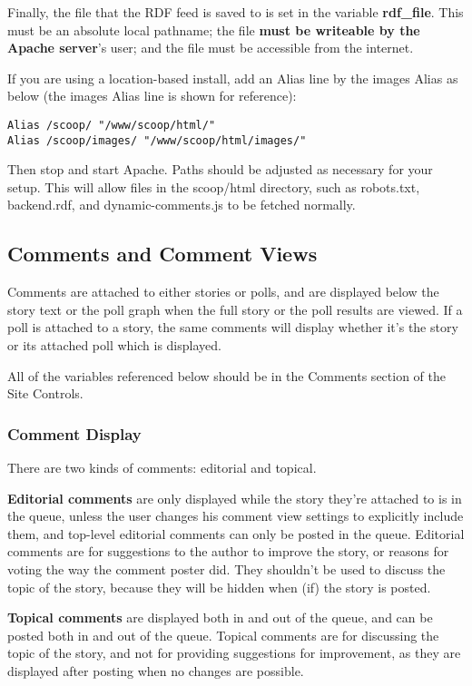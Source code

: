 Finally, the file that the RDF feed is saved to is set in the variable {\bf rdf\_file}.  This must be an absolute local pathname; the file {\bf must be writeable by the Apache server}'s user; and the file must be accessible from the internet.

If you are using a location-based install, add an Alias line by the images Alias as below (the images Alias line is shown for reference):
\begin{verbatim}
Alias /scoop/ "/www/scoop/html/"
Alias /scoop/images/ "/www/scoop/html/images/"
\end{verbatim}

Then stop and start Apache.  Paths should be adjusted as necessary for your setup.  This will allow files in the scoop/html directory, such as robots.txt, backend.rdf, and dynamic-comments.js to be fetched normally.

\subsection{Comments and Comment Views}
\label{features-comment-views}

Comments are attached to either stories or polls, and are displayed below the story text or the poll graph when the full story or the poll results are viewed.  If a poll is attached to a story, the same comments will display whether it's the story or its attached poll which is displayed.

All of the variables referenced below should be in the Comments section of the Site Controls.

\subsubsection{Comment Display}
\label{comments-display}

There are two kinds of comments: editorial and topical.  

{\bf Editorial comments} are only displayed while the story they're attached to is in the queue, unless the user changes his comment view settings to explicitly include them, and top-level editorial comments can only be posted in the queue.  Editorial comments are for suggestions to the author to improve the story, or reasons for voting the way the comment poster did.  They shouldn't be used to discuss the topic of the story, because they will be hidden when (if) the story is posted.  

{\bf Topical comments} are displayed both in and out of the queue, and can be posted both in and out of the queue.  Topical comments are for discussing the topic of the story, and not for providing suggestions for improvement, as they are displayed after posting when no changes are possible.  

